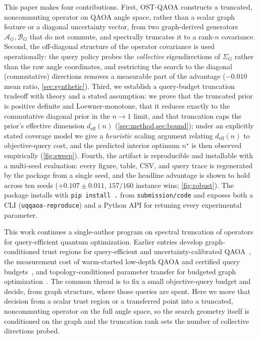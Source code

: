 \documentclass[aps,prresearch,reprint,amsmath,amssymb,floatfix,nofootinbib,superscriptaddress,longbibliography]{revtex4-2}
\theoremstyle{remark}
\newcommand{\QAOA}{\textnormal{\textsc{QAOA}}}
\newcommand{\OSTQAOA}{\textnormal{\textsc{OST-QAOA}}}
\newcommand{\calA}{\mathcal{A}}
\newcommand{\calB}{\mathcal{B}}
\begin{document}
This paper makes four contributions.  First, \OSTQAOA{} constructs a truncated,
noncommuting operator on QAOA angle space, rather than a scalar graph feature or a
diagonal uncertainty vector, from two graph-derived generators
\(\calA_G,\calB_G\) that do not commute, and spectrally truncates it to a
rank-\(n\) covariance.  Second, the off-diagonal structure of the operator
covariance is used operationally: the query policy probes the \emph{collective}
eigendirections of \(\Sigma_G\) rather than the raw angle coordinates, and
restricting the search to the diagonal (commutative) directions removes a
measurable part of the advantage (\(-0.010\) mean ratio, \cref{sec:synthetic}).  Third, we establish a
query-budget truncation tradeoff with theory and a stated assumption: we prove
that the truncated prior is positive definite and Loewner-monotone, that it
reduces exactly to the commutative diagonal prior in the \(n\to1\) limit, and
that truncation caps the prior's effective dimension \(d_{\mathrm{eff}}(n)\)
(\cref{sec:method,sec:bound}); under an explicitly stated coverage model we give a
\emph{heuristic} scaling argument relating \(d_{\mathrm{eff}}(n)\) to
objective-query cost, and the predicted interior optimum \(n^{\star}\) is then
observed empirically (\cref{fig:sweep}).  Fourth, the artifact is
reproducible and installable with a multi-seed evaluation: every figure, table,
CSV, and query trace is regenerated by the package from a single seed, and the
headline advantage is shown to hold across ten seeds (\(+0.107\pm0.011\),
\(157/160\) instance wins; \cref{fig:robust}).  The
package installs with \texttt{pip install .} from \texttt{submission/code} and
exposes both a CLI (\texttt{uqqaoa-reproduce}) and a Python API for retuning every
experimental parameter.

This work continues a single-author program on spectral truncation of
operators for query-efficient quantum optimization.  Earlier entries develop
graph-conditioned trust regions for query-efficient and uncertainty-calibrated
\QAOA{}~\cite{huynh2026gctr,huynh2026gctrcal,huynh2026gctrcalpro}, the
measurement cost of warm-started low-depth \QAOA{} and certified query
budgets~\cite{huynh2026meascost,huynh2026certqb}, and topology-conditioned
parameter transfer for budgeted graph
optimization~\cite{huynh2026paramxfer,huynh2026paramxferB}.
The common thread
is to fix a small objective-query budget and decide, from graph structure, where
those queries are spent.  Here we move that decision from a scalar trust region
or a transferred point into a truncated, noncommuting operator on the full angle
space, so the search geometry itself is conditioned on the graph and the
truncation rank sets the number of collective directions probed.
\end{document}
